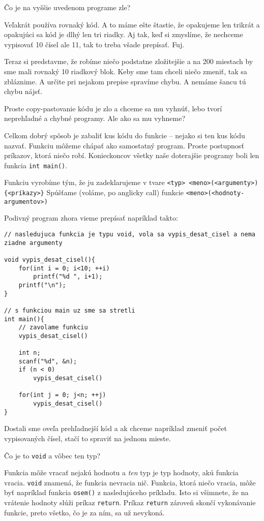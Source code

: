 Čo je na vyššie uvedenom programe zle?

Veľakrát používa rovnaký kód. A to máme ešte štastie, že opakujeme len trikrát
a opakujúci sa kód je dlhý len tri riadky. Aj tak, keď si zmyslíme, že nechceme
vypisovať 10 čísel ale 11, tak to treba všade prepísať. Fuj.

Teraz si predstavme, že robíme niečo podstatne zložitejšie a na 200 miestach by
sme mali rovnaký 10 riadkový blok. Keby sme tam chceli niečo zmeniť, tak sa
zbláznime.  A určite pri nejakom prepise spravíme chybu. A nemáme šancu tú
chybu nájsť.

Proste copy-pastovanie kódu je zlo a chceme sa mu vyhnúť, lebo tvorí
neprehľadné a chybné programy. Ale ako sa mu vyhneme?

\medskip

Celkom dobrý spôsob je zabaliť kus kódu do funkcie -- nejako si ten kus kódu
nazvať.  Funkciu môžeme chápať ako samostatný program. Proste postupnosť
príkazov, ktorá niečo robí.  Konieckoncov všetky naše doterajšie programy boli
len funkcia \verb!int main()!.

Funkciu vyrobíme tým, že ju zadeklarujeme v tvare \verb!<typ> <meno>(<argumenty>){<príkazy>}!
Spúšťame (voláme, po anglicky call) funkcie \verb!<meno>(<hodnoty-argumentov>)!

Podivný program zhora vieme prepísať napríklad takto:

\begin{lstlisting}
// nasledujuca funkcia je typu void, vola sa vypis_desat_cisel a nema ziadne argumenty

void vypis_desat_cisel(){
    for(int i = 0; i<10; ++i)
        printf("%d ", i+1);
    printf("\n"); 
}

// s funkciou main uz sme sa stretli
int main(){
    // zavolame funkciu
    vypis_desat_cisel()
    
    int n;
    scanf("%d", &n);
    if (n < 0)
        vypis_desat_cisel()

    for(int j = 0; j<n; ++j) 
        vypis_desat_cisel()
}
\end{lstlisting}

Dostali sme oveľa prehľadnejší kód a ak chceme napríklad zmeniť počet
vypisovaných čísel, stačí to spraviť na jednom mieste.

\medskip 

Čo je to \verb!void! a vôbec ten typ?

Funkcia môže vracať nejakú hodnotu a \textit{ten} typ je typ hodnoty, akú
funkcia vracia.  \verb!void! znamená, že funkcia nevracia nič. Funkcia, ktorá
niečo vracia, môže byť napríklad funkcia \verb!osem()! z nasledujúceho
príkladu. Isto si všimnete, že na vrátenie hodnoty slúži príkaz \verb!return!.
Príkaz \verb!return! zároveň skončí vykonávanie funkcie, preto všetko, čo je za
ním, sa už nevykoná. 

